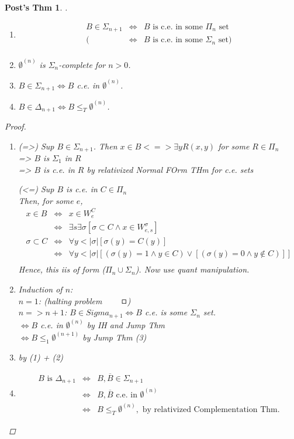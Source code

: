 \documentclass[12pt]{article}
\newcommand{\Conj}[1]{\ensuremath{\overline{#1}}}
\begin{document}
\newtheorem*{pthm}{Post's Thm}
\begin{pthm} .
\begin{enumerate}[(1)]
 \item 
  \begin{align*}
   B \in \Sigma_{n+1} &\Leftrightarrow& B \text{ is c.e. in some $\Pi_n$ set} \\
   (&\Leftrightarrow& B \text{ is c.e. in some $\Sigma_n$ set} )\\
  \end{align*}
 \item
  $\emptyset^{(n)}$ is $\Sigma_n$-complete for $n >0$.
 \item
  $B \in \Sigma_{n+1} \Leftrightarrow B$ c.e. in $\emptyset^{(n)}$.
 \item
  $B \in \Delta_{n+1} \Leftrightarrow B \le_T \emptyset^{(n)}$.
\end{enumerate}
\begin{proof}
\begin{enumerate}[(1)]
 \item  (=>) Sup $B \in \Sigma_{n+1}$.
	Then $ x \in B <=> \exists y R(x,y)$ for some $ R \in \Pi_n$ \\
	=> $B$ is $\Sigma_1$ in $R$ \\
	=> $B$ is c.e. in $R$ by relativized Normal FOrm THm for c.e. sets

	(<=) Sup $B$ is c.e. in $C \in \Pi_n$ \\
	Then, for some $e$,
	\begin{align*}
	 x \in B &\Leftrightarrow& x \in W^C_e \\
		&\Leftrightarrow& \exists s \exists \sigma 
			[ \sigma \subset C \wedge x \in W^{\sigma}_{e,s} ] \\
	\sigma \subset C &\Leftrightarrow& \forall y < |\sigma| [ \sigma(y) = C(y) ] \\
		&\Leftrightarrow& \forall y < |\sigma| 
			[ (\sigma(y) = 1 \wedge y \in C) \vee [ (\sigma(y) = 0 \wedge y \not\in C) ] ] \\
	\end{align*}
	Hence, this iis of form ($\Pi_n \cup \Sigma_n$). Now use quant manipulation.
 \item Induction of $n$: \\
	$n = 1$: (halting problem $\qed$) \\
	$n => n+1$: $B \in Sigma_{n+1} \Leftrightarrow B$ c.e. is some $\Sigma_n$ set. \\
	$\Leftrightarrow B$ c.e. in $\emptyset^{(n)}$ by IH and Jump Thm \\
	$\Leftrightarrow B \le_1  \emptyset^{(n+1)}$ by Jump Thm (3)
 \item by (1) + (2)
 \item 
\begin{align*}
B \text{ is } \Delta_{n+1}  &\Leftrightarrow& B, \Conj{B} \in \Sigma_{n+1} \\
&\Leftrightarrow& B,\Conj{B} \text{ c.e. in } \emptyset^{(n)} \\
&\Leftrightarrow& B \le_T \emptyset^{(n)}, \text{ by relativized Complementation Thm}.
\end{align*}
\end{enumerate}
\end{proof}


\end{pthm}
\end{document}
